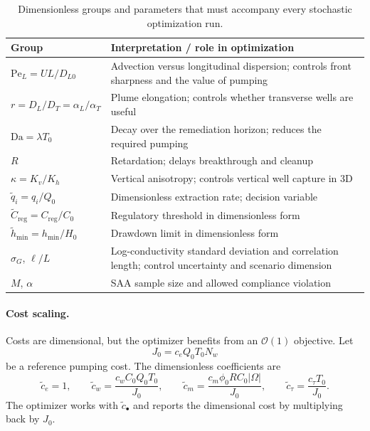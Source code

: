 \documentclass[11pt]{article}
\numberwithin{equation}{section}
\newcommand{\abs}[1]{\left\lvert #1 \right\rvert}
\newcommand{\Pe}{\mathrm{Pe}}
\newcommand{\Da}{\mathrm{Da}}
\newcommand{\tabhead}[1]{\textbf{#1}}
\theoremstyle{plain}
\begin{document}
\begin{table}[htbp]
\centering
\small
\begin{tabularx}{\textwidth}{@{}lY@{}}
\toprule
\tabhead{Group} & \tabhead{Interpretation / role in optimization}\\
\midrule
$\Pe_L=UL/D_{L0}$ & Advection versus longitudinal dispersion; controls front
sharpness and the value of pumping\\
$r=D_L/D_T=\alpha_L/\alpha_T$ & Plume elongation; controls whether transverse
wells are useful\\
$\Da=\lambda T_0$ & Decay over the remediation horizon; reduces the required
pumping\\
$R$ & Retardation; delays breakthrough and cleanup\\
$\kappa=K_v/K_h$ & Vertical anisotropy; controls vertical well capture in 3D\\
$\tilde q_i=q_i/Q_0$ & Dimensionless extraction rate; decision variable\\
$\tilde C_{\mathrm{reg}}=C_{\mathrm{reg}}/C_0$ & Regulatory threshold in
dimensionless form\\
$\tilde h_{\min}=h_{\min}/H_0$ & Drawdown limit in dimensionless form\\
$\sigma_G$, $\ell/L$ & Log-conductivity standard deviation and correlation
length; control uncertainty and scenario dimension\\
$M$, $\alpha$ & SAA sample size and allowed compliance violation\\
\bottomrule
\end{tabularx}
\caption{Dimensionless groups and parameters that must accompany every
stochastic optimization run.}
\label{tab:groups}
\end{table}

\paragraph{Cost scaling.}
Costs are dimensional, but the optimizer benefits from an $\mathcal{O}(1)$
objective.  Let
\begin{equation}
\label{eq:J0}
J_0=c_eQ_0T_0N_w
\end{equation}
be a reference pumping cost.  The dimensionless coefficients are
\begin{equation}
\label{eq:cscaled}
\tilde c_e=1,\qquad
\tilde c_w=\frac{c_wC_0Q_0T_0}{J_0},\qquad
\tilde c_m=\frac{c_m\phi_0RC_0\abs{\Omega}}{J_0},\qquad
\tilde c_\tau=\frac{c_\tau T_0}{J_0}.
\end{equation}
The optimizer works with $\tilde c_\bullet$ and reports the dimensional cost
by multiplying back by $J_0$.
\end{document}

